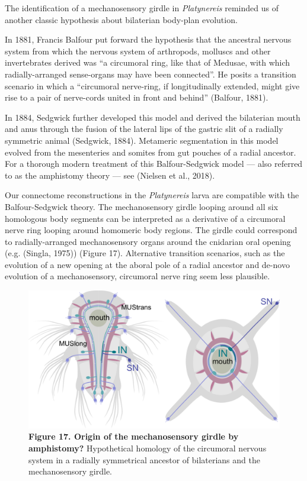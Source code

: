 \documentclass[
  11pt,
]{article}
\begin{document}
The identification of a mechanosensory girdle in \emph{Platynereis}
reminded us of another classic hypothesis about bilaterian body-plan
evolution.

In 1881, Francis Balfour put forward the hypothesis that the ancestral
nervous system from which the nervous system of arthropods, molluscs and
other invertebrates derived was ``a circumoral ring, like that of
Medusae, with which radially-arranged sense-organs may have been
connected''. He posits a transition scenario in which a ``circumoral
nerve-ring, if longitudinally extended, might give rise to a pair of
nerve-cords united in front and behind'' (Balfour, 1881).

In 1884, Sedgwick further developed this model and derived the
bilaterian mouth and anus through the fusion of the lateral lips of the
gastric slit of a radially symmetric animal (Sedgwick, 1884). Metameric
segmentation in this model evolved from the mesenteries and somites from
gut pouches of a radial ancestor. For a thorough modern treatment of
this Balfour-Sedgwick model --- also referred to as the amphistomy
theory --- see (Nielsen et al., 2018).

Our connectome reconstructions in the \emph{Platynereis} larva are
compatible with the Balfour-Sedgwick theory. The mechanosensory girdle
looping around all six homologous body segments can be interpreted as a
derivative of a circumoral nerve ring looping around homomeric body
regions. The girdle could correspond to radially-arranged mechanosensory
organs around the cnidarian oral opening (e.g. (Singla, 1975)) (Figure
17). Alternative transition scenarios, such as the evolution of a new
opening at the aboral pole of a radial ancestor and de-novo evolution of
a mechanosensory, circumoral nerve ring seem less plausible.

\begin{figure}[H]

{\centering \includegraphics[width=1\textwidth,height=\textheight]{Figures/Figure17.png}

}

\caption{\textbf{Figure 17. Origin of the mechanosensory girdle by
amphistomy?} Hypothetical homology of the circumoral nervous system in a
radially symmetrical ancestor of bilaterians and the mechanosensory
girdle.}

\end{figure}%
\end{document}
